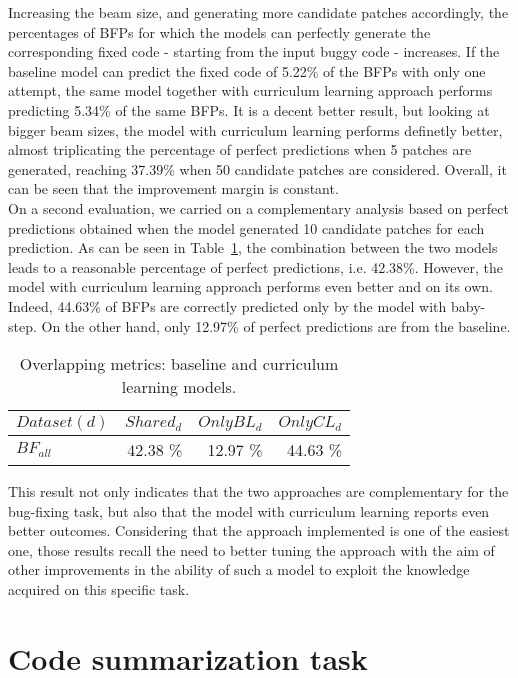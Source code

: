 Increasing the beam size, and generating more candidate patches accordingly,
the percentages of BFPs for which the models can perfectly generate the corresponding
fixed code - starting from the input buggy code - increases. If the baseline model can predict
the fixed code of 5.22\% of the BFPs with only one attempt, the same model together with 
curriculum learning approach performs predicting 5.34\% of the same BFPs. It is a decent 
better result,
but looking at bigger beam sizes, the model with curriculum learning performs 
definetly better, almost triplicating the percentage of perfect predictions when 5 patches are generated,
reaching 37.39\% when 50 candidate patches are considered. Overall, it can be seen that
the improvement margin is constant.\\
On a second evaluation, we carried on a complementary analysis based on perfect predictions
obtained when the model generated 10 candidate patches for each prediction. 
As can be seen 
in Table~\ref{table:pp_bugfixing_overlap}, the combination between the two models 
leads to a reasonable percentage of perfect predictions, i.e. 42.38\%. However, the model 
with curriculum learning approach performs even better and on its own. Indeed, 44.63\% of BFPs are correctly predicted
only by the model with baby-step. On the other hand, only 12.97\% of perfect predictions are from the baseline.
\begin{table}[h!]
    \centering
    \begin{tabular}{l|r|r|r}
    \(Dataset (d)\) & \(Shared_d\) & \(OnlyBL_d\) & \(OnlyCL_d\)\\ [0.5ex]
    \hline 
    \(BF_{all}\) & 42.38 \% & 12.97 \% & 44.63 \%\\  [1ex]
    \end{tabular}
    \caption{Overlapping metrics: baseline and curriculum learning models.}
    \label{table:pp_bugfixing_overlap}
\end{table}
This result not only indicates that the two approaches are complementary for
the bug-fixing task, but also that the model with curriculum learning reports even 
better outcomes. Considering that the approach implemented is one of the easiest one,
those results recall the need to better tuning the approach with the aim of 
other improvements in the ability of such a model to exploit the knowledge acquired on 
this specific task. 

\section{Code summarization task}


